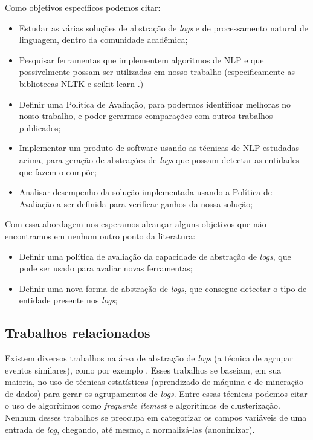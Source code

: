 \documentclass[
	12pt,				%
	openright,			%
	twoside,			%
	a4paper,			%
	english,			%
	spanish,			%
	brazil,				%
	]{abntex2}
\begin{document}
Como objetivos específicos podemos citar:
\begin{itemize}
	\item Estudar as várias soluções de abstração de \emph{logs} e de processamento natural de linguagem, dentro da comunidade acadêmica;

	\item Pesquisar ferramentas que implementem algoritmos de NLP e que possivelmente possam ser utilizadas em nosso trabalho (especificamente as bibliotecas NLTK \cite{bird2009natural} e scikit-learn \cite{pedregosa2008scikitlearn}.)
	
	\item Definir uma Política de Avaliação, para podermos identificar melhoras no nosso trabalho, e poder gerarmos comparações com outros trabalhos publicados;
	
	\item Implementar um produto de software usando as técnicas de NLP estudadas acima, para geração de abstrações de \emph{logs} que possam detectar as entidades que fazem o compõe;
	
	\item Analisar desempenho da solução implementada usando a Política de Avaliação a ser definida para verificar ganhos da nossa solução;
		
\end{itemize}

Com essa abordagem nos esperamos alcançar alguns objetivos que não encontramos em nenhum outro ponto da literatura:

\begin{itemize}
	\item Definir uma política de avaliação da capacidade de abstração de \emph{logs}, que pode ser usado para avaliar novas ferramentas;
	\item Definir uma nova forma de abstração de \emph{logs}, que consegue detectar o tipo de entidade presente nos \emph{logs};
\end{itemize}

\subsection{Trabalhos relacionados}
Existem diversos trabalhos na área de abstração de \emph{logs} (a técnica de agrupar eventos similares), como por exemplo \cite{jian2008automated, nagappan2010abstracting, vaarandi2003data}. Esses trabalhos se baseiam, em sua maioria, no uso de técnicas estatísticas (aprendizado de máquina e de mineração de dados) para gerar os agrupamentos de \emph{logs}. Entre essas técnicas podemos citar o uso de algorítimos como \emph{frequente itemset} e algorítimos de clusterização. Nenhum desses trabalhos se preocupa em categorizar os campos variáveis de uma entrada de \emph{log}, chegando, até mesmo, a normalizá-las (anonimizar).
\end{document}
